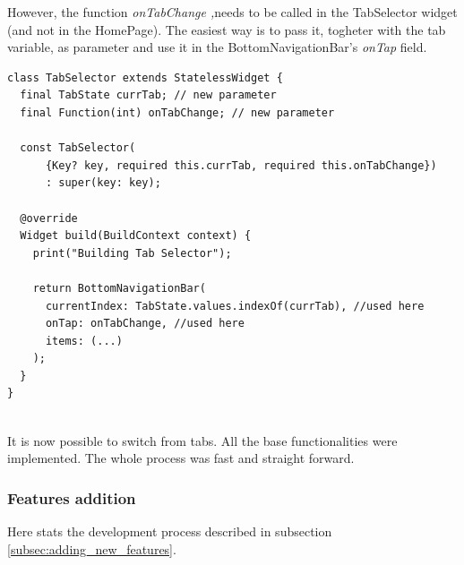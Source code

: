 However, the function  \textit{onTabChange ,}needs to be called in the TabSelector widget (and not in the HomePage). The easiest way is to pass it, togheter with the tab variable, as parameter and use it in the BottomNavigationBar's \textit{onTap }field.
\mbox{}\\
\begin{code}
\mbox{}
\label{code:2.31}
\begin{verbatim}
class TabSelector extends StatelessWidget {
  final TabState currTab; // new parameter
  final Function(int) onTabChange; // new parameter

  const TabSelector(
      {Key? key, required this.currTab, required this.onTabChange})
      : super(key: key);

  @override
  Widget build(BuildContext context) {
    print("Building Tab Selector");

    return BottomNavigationBar(
      currentIndex: TabState.values.indexOf(currTab), //used here
      onTap: onTabChange, //used here
      items: (...)
    );
  }
}

\end{verbatim}
\end{code}
\mbox{}\\
It is now possible to switch from tabs. All the base functionalities were implemented. The whole process was fast and straight forward. 



\subsubsection{Features addition} 
\label{par:feature_addition_inherited_widget}
Here stats the development process described in subsection \ref{subsec:adding_new_features}.

